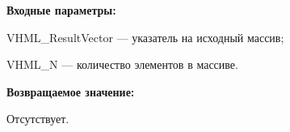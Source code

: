 \textbf{Входные параметры:}
 
VHML\_ResultVector --- указатель на исходный массив;
 
VHML\_N --- количество элементов в массиве.

\textbf{Возвращаемое значение:}

Отсутствует.